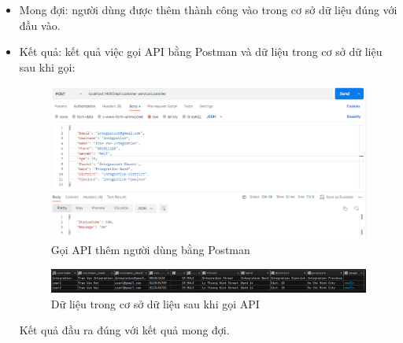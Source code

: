 \begin{itemize}
\begin{itemize}
\begin{figure}[!htp]
                    \end{figure}
              \item Mong đợi: người dùng được thêm thành công vào trong cơ sở dữ liệu đúng với đầu vào.
              \item Kết quả: kết quả việc gọi API bằng Postman và dữ liệu trong cơ sở dữ liệu sau khi gọi:\\

                    \begin{figure}[!htp]
                        \begin{center}
                            \includegraphics[width=15cm]{img/testing/inte_got_2.PNG}
                        \end{center}
                        \caption{Gọi API thêm người dùng bằng Postman}
                    \end{figure}
                    \begin{figure}[!htp]
                        \begin{center}
                            \includegraphics[width=15cm]{img/testing/inte_got_db_2.PNG}
                        \end{center}
                        \caption{Dữ liệu trong cơ sở dữ liệu sau khi gọi API}
                    \end{figure}
                    Kết quả đầu ra đúng với kết quả mong đợi.
          \end{itemize}
\end{itemize}

